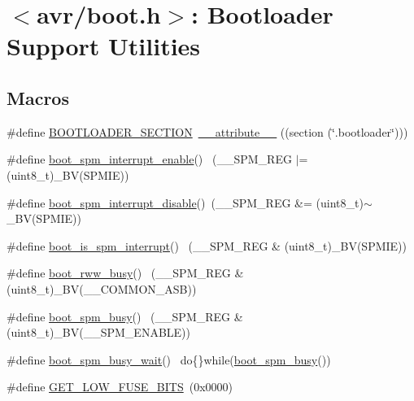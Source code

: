 \hypertarget{group__avr__boot}{}\section{$<$avr/boot.h$>$\+: Bootloader Support Utilities}
\label{group__avr__boot}
\subsection*{Macros}
\begin{DoxyCompactItemize}
\item 
\#define \hyperlink{group__avr__boot_ga8a60eb0985d40ff71c42bb18f0f5789e}{B\+O\+O\+T\+L\+O\+A\+D\+E\+R\+\_\+\+S\+E\+C\+T\+I\+ON}~\hyperlink{stdint_8h_a772744ca0816d59e120b8f8a1ede64f0}{\+\_\+\+\_\+attribute\+\_\+\+\_\+} ((section (\char`\"{}.bootloader\char`\"{})))
\item 
\#define \hyperlink{group__avr__boot_ga5b1c861e7ea2d0289b1922d458137a93}{boot\+\_\+spm\+\_\+interrupt\+\_\+enable}()  ~(\+\_\+\+\_\+\+S\+P\+M\+\_\+\+R\+EG $\vert$= (uint8\+\_\+t)\+\_\+\+BV(S\+P\+M\+IE))
\item 
\#define \hyperlink{group__avr__boot_gaf1e01d09c839793a6c0c990b1c5ae8b3}{boot\+\_\+spm\+\_\+interrupt\+\_\+disable}()~(\+\_\+\+\_\+\+S\+P\+M\+\_\+\+R\+EG \&= (uint8\+\_\+t)$\sim$\+\_\+\+BV(S\+P\+M\+IE))
\item 
\#define \hyperlink{group__avr__boot_gac6179ee69a73970e370af11f5d9aec73}{boot\+\_\+is\+\_\+spm\+\_\+interrupt}()          ~(\+\_\+\+\_\+\+S\+P\+M\+\_\+\+R\+EG \& (uint8\+\_\+t)\+\_\+\+BV(S\+P\+M\+IE))
\item 
\#define \hyperlink{group__avr__boot_ga68addb59347531960dcdbfe6c8425e04}{boot\+\_\+rww\+\_\+busy}()                ~(\+\_\+\+\_\+\+S\+P\+M\+\_\+\+R\+EG \& (uint8\+\_\+t)\+\_\+\+BV(\+\_\+\+\_\+\+C\+O\+M\+M\+O\+N\+\_\+\+A\+SB))
\item 
\#define \hyperlink{group__avr__boot_gaad75076ad14371bbe9d811a19db0ef79}{boot\+\_\+spm\+\_\+busy}()                          ~(\+\_\+\+\_\+\+S\+P\+M\+\_\+\+R\+EG \& (uint8\+\_\+t)\+\_\+\+BV(\+\_\+\+\_\+\+S\+P\+M\+\_\+\+E\+N\+A\+B\+LE))
\item 
\#define \hyperlink{group__avr__boot_gada801d48596bd6e0119b310ea5887247}{boot\+\_\+spm\+\_\+busy\+\_\+wait}()                ~do\{\}while(\hyperlink{group__avr__boot_gaad75076ad14371bbe9d811a19db0ef79}{boot\+\_\+spm\+\_\+busy}())
\item 
\#define \hyperlink{group__avr__boot_gac68c37ecf2354ba2af6e08379d65899f}{G\+E\+T\+\_\+\+L\+O\+W\+\_\+\+F\+U\+S\+E\+\_\+\+B\+I\+TS}~(0x0000)

\end{DoxyCompactItemize}

